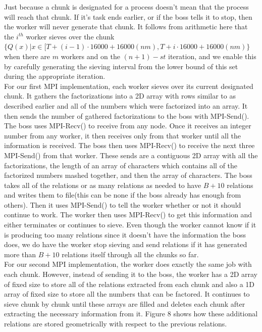 \documentclass[11pt,twocolumn]{article}
\begin{document}
Just because a chunk is designated for a process doesn't mean that the process will reach that chunk. If it's task ends earlier, or if the boss tells it to stop, then the worker will never generate that chunk. It follows from arithmetic here that the $i^{th}$ worker sieves over the chunk $\{Q(x) | x \in [T + (i-1) \cdot 16000 + 16000(nm),  T + i \cdot 16000 + 16000(nm) \}$ when there are $m$ workers and on the $(n+1)-st$ iteration, and we enable this by carefully generating the sieving interval from the lower bound of this set during the appropriate iteration. \\
\indent For our first MPI implementation, each worker sieves over its current designated chunk. It gathers the factorizations into a 2D array with rows similar to as described earlier and all of the numbers which were factorized into an array. It then sends the number of gathered factorizations to the boss with MPI-Send(). The boss uses MPI-Recv() to receive from any node. Once it receives an integer number from any worker, it then receives only from that worker until all the information is received. The boss then uses MPI-Recv() to receive the next three MPI-Send() from that worker. These sends are a contiguous 2D array with all the factorizations, the length of an array of characters which contains all of the factorized numbers mashed together, and then the array of characters. The boss takes all of the relations or as many relations as needed to have $B+10$ relations and writes them to file(this can be none if the boss already has enough from others). Then it uses MPI-Send() to tell the worker whether or not it should continue to work. The worker then uses MPI-Recv() to get this information and either terminates or continues to sieve. Even though the worker cannot know if it is producing too many relations since it doesn't have the information the boss does, we do have the worker stop sieving and send relations if it has generated more than $B+10$ relations itself through all the chunks so far. \\
\indent For our second MPI implementation, the worker does exactly the same job with each chunk. However, instead of sending it to the boss, the worker has a 2D array of fixed size to store all of the relations extracted from each chunk and also a 1D array of fixed size to store all the numbers that can be factored. It continues to sieve chunk by chunk until these arrays are filled and deletes each chunk after extracting the necessary information from it. Figure 8 shows how these additional relations are stored geometrically with respect to the previous relations.
\end{document}
